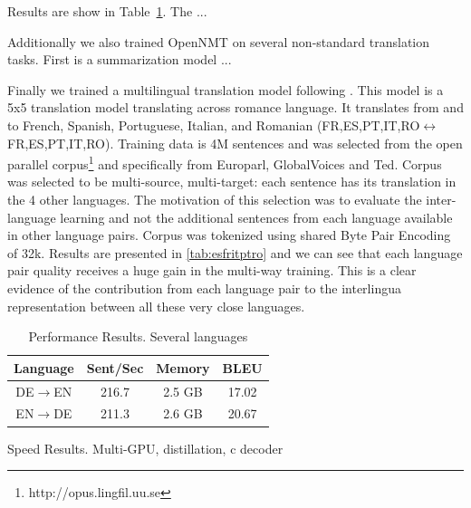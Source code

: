 \documentclass[11pt]{article}
\begin{document}
Results are show in Table~\ref{tab:res}. The ...


Additionally we also trained OpenNMT on several non-standard
translation tasks. First is a summarization model \cite{} ...

Finally we trained a multilingual translation model following . This model is a 5x5 translation 
model translating across romance language. It translates from and to 
French, Spanish, Portuguese, Italian, and Romanian (FR,ES,PT,IT,RO$\leftrightarrow$FR,ES,PT,IT,RO). Training data is 4M sentences and was selected from the open parallel corpus\footnote{http://opus.lingfil.uu.se} and specifically from Europarl, GlobalVoices and Ted. Corpus was selected to be multi-source, multi-target: each sentence has its translation in the 4 other languages. The motivation of this selection was to evaluate the inter-language learning and not the additional sentences from each language available in other language pairs. Corpus was tokenized using shared Byte Pair Encoding of 32k.
Results are presented in \ref{tab:esfritptro} and we can see that each language pair quality receives a huge gain in the multi-way training. This is a clear evidence of the contribution from each language pair to the interlingua representation between all these very close languages.









\begin{table}
  \centering
  \begin{tabular}{cccc}
    \toprule
     Language & Sent/Sec & Memory & BLEU \\
    \midrule
    DE$\rightarrow$EN& 216.7 & 2.5 GB & 17.02\\
    EN$\rightarrow$DE& 211.3 & 2.6 GB & 20.67 \\
    \midrule

    \bottomrule
  \end{tabular}
  \label{tab:res}
  \caption{Performance Results. Several languages}
\end{table}


\begin{table}
  \centering
  
  \caption{Speed Results. Multi-GPU, distillation, c decoder}
\end{table}
\end{document}
